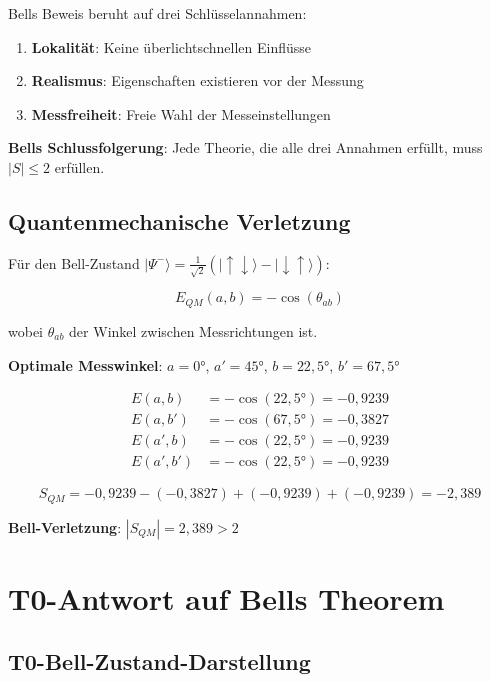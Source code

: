 \documentclass[12pt,a4paper]{article}
\begin{document}
	Bells Beweis beruht auf drei Schlüsselannahmen:
	
	\begin{enumerate}
		\item \textbf{Lokalität}: Keine überlichtschnellen Einflüsse
		\item \textbf{Realismus}: Eigenschaften existieren vor der Messung
		\item \textbf{Messfreiheit}: Freie Wahl der Messeinstellungen
	\end{enumerate}
	
	\textbf{Bells Schlussfolgerung}: Jede Theorie, die alle drei Annahmen erfüllt, muss $|S| \leq 2$ erfüllen.
	
	\subsection{Quantenmechanische Verletzung}
	
	Für den Bell-Zustand $|\Psi^-\rangle = \frac{1}{\sqrt{2}}(|\uparrow\downarrow\rangle - |\downarrow\uparrow\rangle)$:
	
	\begin{equation}
		E_{QM}(a,b) = -\cos(\theta_{ab})
	\end{equation}
	
	wobei $\theta_{ab}$ der Winkel zwischen Messrichtungen ist.
	
	\textbf{Optimale Messwinkel}: $a = 0°$, $a' = 45°$, $b = 22,5°$, $b' = 67,5°$
	
	\begin{align}
		E(a,b) &= -\cos(22,5°) = -0,9239 \\
		E(a,b') &= -\cos(67,5°) = -0,3827 \\
		E(a',b) &= -\cos(22,5°) = -0,9239 \\
		E(a',b') &= -\cos(22,5°) = -0,9239
	\end{align}
	
	\begin{equation}
		S_{QM} = -0,9239 - (-0,3827) + (-0,9239) + (-0,9239) = -2,389
	\end{equation}
	
	\textbf{Bell-Verletzung}: $|S_{QM}| = 2,389 > 2$
	
	\section{T0-Antwort auf Bells Theorem}
	
	\subsection{T0-Bell-Zustand-Darstellung}
	
\end{document}
